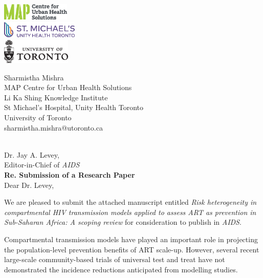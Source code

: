 \documentclass{article}
\begin{document}
\begin{minipage}{0.5\linewidth}
  \includegraphics[height=0.8cm]{map-cuhs.eps}\\[1ex]
  \includegraphics[height=0.8cm]{smh.eps}     \\[1ex]
  \includegraphics[height=1.2cm]{uoft.eps}
\end{minipage}%
\begin{minipage}{0.5\linewidth}
  \begin{flushright}\small
    Sharmistha Mishra\\
    MAP Centre for Urban Health Solutions\\
    Li Ka Shing Knowledge Institute\\
    St Michael's Hospital,
    Unity Health Toronto\\
    University of Toronto\\
    sharmistha.mishra@utoronto.ca
  \end{flushright}
\end{minipage}
\\[5ex]
Dr. Jay A. Levey,\\
Editor-in-Chief of \textit{AIDS}\\[2ex]
\textbf{Re. Submission of a Research Paper}\\[1em]
Dear Dr. Levey,
\par
We are pleased to submit the attached manuscript entitled
\textit{Risk heterogeneity in compartmental HIV transmission models
  applied to assess ART as prevention in Sub-Saharan Africa: A scoping review}
for consideration to publish in \textit{AIDS}.
\par
Compartmental transmission models have played an important role in projecting
the population-level prevention benefits of ART scale-up.
However, several recent large-scale community-based trials of universal test and treat
have not demonstrated the incidence reductions anticipated from modelling studies.
\end{document}
